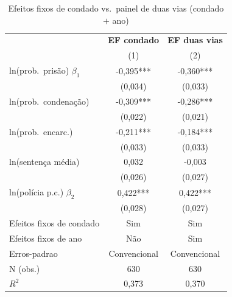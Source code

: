 \begin{table}[htbp]\centering
\caption{Efeitos fixos de condado vs.\ painel de duas vias (condado $+$ ano)}\label{tab:q3_duas_vias}
\small
\begin{tabular}{lcc}
\toprule
 & \textbf{EF condado} & \textbf{EF duas vias} \\
 & (1) & (2) \\
\midrule
ln(prob.\ pris\~ao) $\beta_1$ & -0,395*** & -0,360*** \\
 & (0,034) & (0,033) \\
ln(prob.\ condena\c{c}\~ao) & -0,309*** & -0,286*** \\
 & (0,022) & (0,021) \\
ln(prob.\ encarc.) & -0,211*** & -0,184*** \\
 & (0,033) & (0,033) \\
ln(senten\c{c}a m\'edia) & 0,032 & -0,003 \\
 & (0,026) & (0,027) \\
ln(pol\'icia p.c.) $\beta_2$ & 0,422*** & 0,422*** \\
 & (0,028) & (0,027) \\
\midrule
Efeitos fixos de condado & Sim & Sim \\
Efeitos fixos de ano & N\~ao & Sim \\
Erros-padrao & Convencional & Convencional \\
N (obs.) & 630 & 630 \\
$R^2$ & 0,373 & 0,370 \\
\bottomrule
\end{tabular}
\par{}
\end{table}
